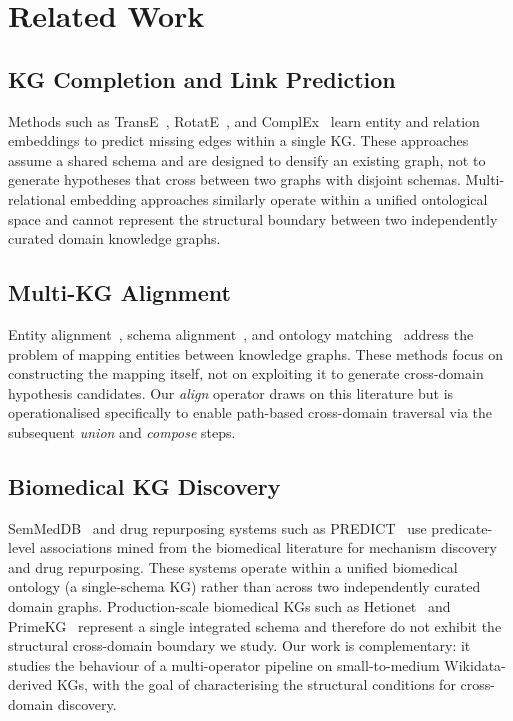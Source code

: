 \section{Related Work}
\label{sec:related}

\subsection{KG Completion and Link Prediction}

Methods such as TransE~\cite{TODO-TransE}, RotatE~\cite{TODO-RotatE}, and
ComplEx~\cite{TODO-ComplEx} learn entity and relation embeddings to predict missing
edges within a single KG.
These approaches assume a shared schema and are designed to densify an existing graph,
not to generate hypotheses that cross between two graphs with disjoint schemas.
Multi-relational embedding approaches similarly operate within a unified ontological
space and cannot represent the structural boundary between two independently curated
domain knowledge graphs.

\subsection{Multi-KG Alignment}

Entity alignment~\cite{TODO-entity-alignment-survey},
schema alignment~\cite{TODO-schema-alignment}, and ontology
matching~\cite{TODO-ontology-matching} address the problem of mapping entities
between knowledge graphs.
These methods focus on constructing the mapping itself, not on exploiting it to
generate cross-domain hypothesis candidates.
Our \textit{align} operator draws on this literature but is operationalised
specifically to enable path-based cross-domain traversal via the subsequent
\textit{union} and \textit{compose} steps.

\subsection{Biomedical KG Discovery}

SemMedDB~\cite{TODO-SemMedDB} and drug repurposing systems such as
PREDICT~\cite{TODO-PREDICT} use predicate-level associations mined from the
biomedical literature for mechanism discovery and drug repurposing.
These systems operate within a unified biomedical ontology (a single-schema KG)
rather than across two independently curated domain graphs.
Production-scale biomedical KGs such as Hetionet~\cite{TODO-Hetionet} and
PrimeKG~\cite{TODO-PrimeKG} represent a single integrated schema and therefore
do not exhibit the structural cross-domain boundary we study.
Our work is complementary: it studies the behaviour of a multi-operator pipeline
on small-to-medium Wikidata-derived KGs, with the goal of characterising the
structural conditions for cross-domain discovery.

